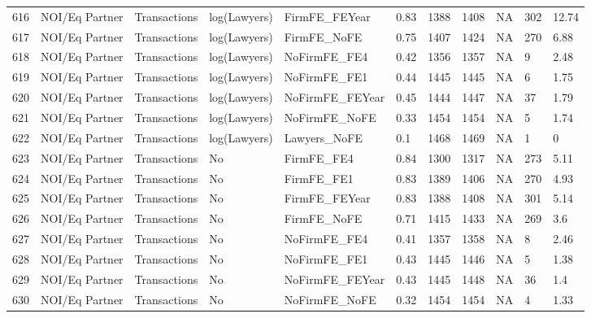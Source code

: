 \begin{table}[ht]
\begin{tabular}{rllllllllll}
  616 & NOI/Eq Partner & Transactions & log(Lawyers) & FirmFE\_FEYear & 0.83 & 1388 & 1408 & NA & 302 & 12.74 \\ 
  617 & NOI/Eq Partner & Transactions & log(Lawyers) & FirmFE\_NoFE & 0.75 & 1407 & 1424 & NA & 270 & 6.88 \\ 
  618 & NOI/Eq Partner & Transactions & log(Lawyers) & NoFirmFE\_FE4 & 0.42 & 1356 & 1357 & NA & 9 & 2.48 \\ 
  619 & NOI/Eq Partner & Transactions & log(Lawyers) & NoFirmFE\_FE1 & 0.44 & 1445 & 1445 & NA & 6 & 1.75 \\ 
  620 & NOI/Eq Partner & Transactions & log(Lawyers) & NoFirmFE\_FEYear & 0.45 & 1444 & 1447 & NA & 37 & 1.79 \\ 
  621 & NOI/Eq Partner & Transactions & log(Lawyers) & NoFirmFE\_NoFE & 0.33 & 1454 & 1454 & NA & 5 & 1.74 \\ 
  622 & NOI/Eq Partner & Transactions & log(Lawyers) & Lawyers\_NoFE & 0.1 & 1468 & 1469 & NA & 1 & 0 \\ 
  623 & NOI/Eq Partner & Transactions & No & FirmFE\_FE4 & 0.84 & 1300 & 1317 & NA & 273 & 5.11 \\ 
  624 & NOI/Eq Partner & Transactions & No & FirmFE\_FE1 & 0.83 & 1389 & 1406 & NA & 270 & 4.93 \\ 
  625 & NOI/Eq Partner & Transactions & No & FirmFE\_FEYear & 0.83 & 1388 & 1408 & NA & 301 & 5.14 \\ 
  626 & NOI/Eq Partner & Transactions & No & FirmFE\_NoFE & 0.71 & 1415 & 1433 & NA & 269 & 3.6 \\ 
  627 & NOI/Eq Partner & Transactions & No & NoFirmFE\_FE4 & 0.41 & 1357 & 1358 & NA & 8 & 2.46 \\ 
  628 & NOI/Eq Partner & Transactions & No & NoFirmFE\_FE1 & 0.43 & 1445 & 1446 & NA & 5 & 1.38 \\ 
  629 & NOI/Eq Partner & Transactions & No & NoFirmFE\_FEYear & 0.43 & 1445 & 1448 & NA & 36 & 1.4 \\ 
  630 & NOI/Eq Partner & Transactions & No & NoFirmFE\_NoFE & 0.32 & 1454 & 1454 & NA & 4 & 1.33 \\ 
   \hline
\end{tabular}
\end{table}
